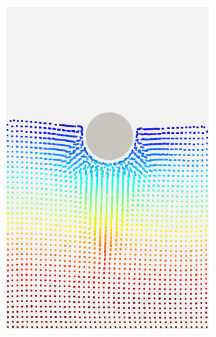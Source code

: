 \begin{figure}[H]
	\centering
	\begin{subfigure}{0.38\columnwidth}    
		\centering
		\includegraphics[width=1.0\textwidth]{images/FSI_Comparison/CD_SPH.png}
	\end{subfigure}
	\begin{subfigure}{0.38\columnwidth}
		\centering

\end{subfigure}
\end{figure}
